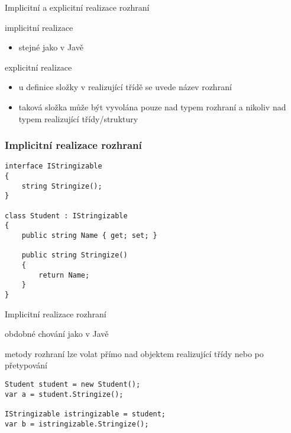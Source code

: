 \begin{frame}[fragile]
\begin{bitemize}{Implicitní a explicitní realizace rozhraní}
\item implicitní realizace
\begin{itemize}
\item stejné jako v Javě
\end{itemize}

\item explicitní realizace
\begin{itemize}
\item u definice složky v realizující třídě se uvede název rozhraní
\item taková složka může být vyvolána pouze nad typem rozhraní a nikoliv nad typem realizující třídy/struktury
\end{itemize}

\end{bitemize}
\end{frame}





\begin{frame}[fragile]
\frametitle{Implicitní realizace rozhraní}
\vfill
\begin{yesblock}
\begin{lstlisting}[basicstyle=\small]
interface IStringizable
{
    string Stringize();
}

class Student : IStringizable
{
    public string Name { get; set; }

    public string Stringize()
    {
        return Name;
    }
}
\end{lstlisting}
\end{yesblock}
\vfill
\end{frame}


\begin{frame}[fragile]
\vfill
\begin{bitemize}{Implicitní realizace rozhraní}
\item obdobné chování jako v Javě
\item metody rozhraní lze volat přímo nad objektem realizující třídy nebo po přetypování
\end{bitemize}
\vfill
\begin{yesblock}
\begin{lstlisting}[basicstyle=\small]
Student student = new Student();
var a = student.Stringize();

IStringizable istringizable = student;
var b = istringizable.Stringize();
\end{lstlisting}
\end{yesblock}
\vfill
\end{frame}







